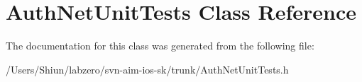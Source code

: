 \hypertarget{interface_auth_net_unit_tests}{
\section{AuthNetUnitTests Class Reference}
\label{interface_auth_net_unit_tests}
}


The documentation for this class was generated from the following file:\begin{DoxyCompactItemize}
\item 
/Users/Shiun/labzero/svn-\/aim-\/ios-\/sk/trunk/AuthNetUnitTests.h\end{DoxyCompactItemize}
